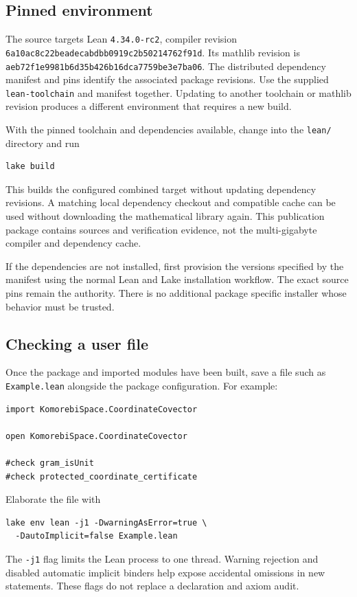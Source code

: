 \documentclass[11pt]{article}
\newcommand{\leanname}[1]{{\small\ttfamily\nolinkurl{#1}}}
\begin{document}
\subsection{Pinned environment}
The source targets Lean \leanname{4.34.0-rc2}, compiler revision
\leanname{6a10ac8c22beadecabdbb0919c2b50214762f91d}. Its mathlib revision is
\leanname{aeb72f1e9981b6d35b426b16dca7759be3e7ba06}.
The distributed dependency manifest and pins identify the associated package revisions. Use the supplied \leanname{lean-toolchain} and manifest together. Updating to another toolchain or mathlib revision produces a different environment that requires a new build.

With the pinned toolchain and dependencies available, change into the \leanname{lean/} directory and run
\begin{verbatim}
lake build
\end{verbatim}
This builds the configured combined target without updating dependency revisions. A matching local dependency checkout and compatible cache can be used without downloading the mathematical library again. This publication package contains sources and verification evidence, not the multi-gigabyte compiler and dependency cache.

If the dependencies are not installed, first provision the versions specified by the manifest using the normal Lean and Lake installation workflow. The exact source pins remain the authority. There is no additional package specific installer whose behavior must be trusted.

\subsection{Checking a user file}
Once the package and imported modules have been built, save a file such as \leanname{Example.lean} alongside the package configuration. For example:
\begin{verbatim}
import KomorebiSpace.CoordinateCovector

open KomorebiSpace.CoordinateCovector

#check gram_isUnit
#check protected_coordinate_certificate
\end{verbatim}
Elaborate the file with
\begin{verbatim}
lake env lean -j1 -DwarningAsError=true \
  -DautoImplicit=false Example.lean
\end{verbatim}
The \leanname{-j1} flag limits the Lean process to one thread. Warning rejection and disabled automatic implicit binders help expose accidental omissions in new statements. These flags do not replace a declaration and axiom audit.
\end{document}
